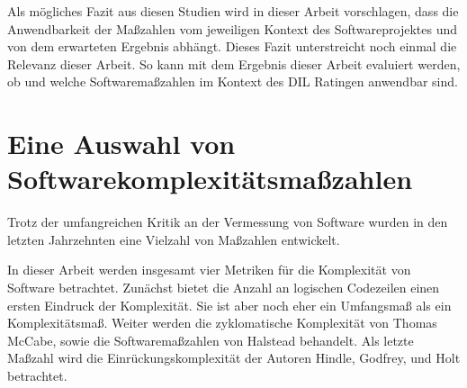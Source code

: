 Als mögliches Fazit aus diesen Studien wird in dieser Arbeit
vorschlagen, dass die Anwendbarkeit der Maßzahlen vom jeweiligen Kontext
des Softwareprojektes und von dem erwarteten Ergebnis abhängt. Dieses
Fazit unterstreicht noch einmal die Relevanz dieser Arbeit. So kann mit
dem Ergebnis dieser Arbeit evaluiert werden, ob und welche
Softwaremaßzahlen im Kontext des \ac{DIL} Ratingen anwendbar sind.

\section{Eine Auswahl von Softwarekomplexitätsmaßzahlen}\label{eine-auswahl-von-softwarekomplexitatsmasszahlen}

Trotz der umfangreichen Kritik an der Vermessung von Software wurden in
den letzten Jahrzehnten eine Vielzahl von Maßzahlen entwickelt.

In dieser Arbeit werden insgesamt vier Metriken für die Komplexität von
Software betrachtet. Zunächst bietet die Anzahl an logischen Codezeilen
einen ersten Eindruck der Komplexität. Sie ist aber noch eher ein
Umfangsmaß als ein Komplexitätsmaß. Weiter werden die zyklomatische
Komplexität von Thomas McCabe, sowie die Softwaremaßzahlen von Halstead
behandelt. Als letzte Maßzahl wird die Einrückungskomplexität der
Autoren Hindle, Godfrey, und Holt betrachtet.

